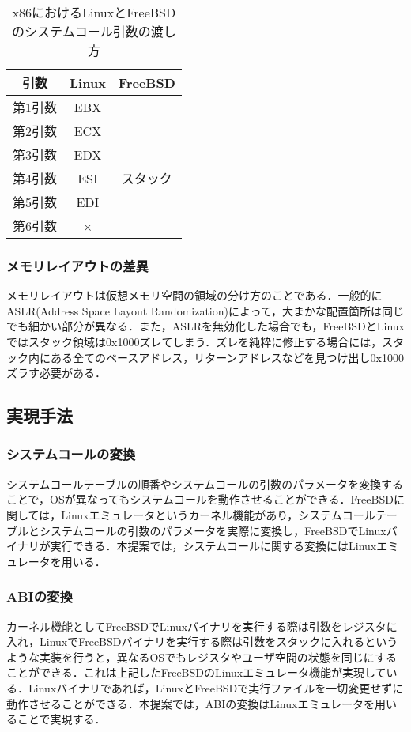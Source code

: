 \documentclass[11pt]{jarticle}
\begin{document}
\begin{table}
  \caption{x86におけるLinuxとFreeBSDのシステムコール引数の渡し方}
  \label{tb:argument}
  \begin{center}
  \begin{tabular}{|c|c|c|} \hline
    引数 & Linux & FreeBSD \\ \hline \hline
    第1引数 & EBX &  \\ \cline{1-2}
    第2引数 & ECX &  \\ \cline{1-2}
    第3引数 & EDX &  \\ \cline{1-2}
    第4引数 & ESI & スタック \\ \cline{1-2}
    第5引数 & EDI &  \\ \cline{1-2}
    第6引数 & × &  \\ \hline
  \end{tabular}
\end{center}
\end{table}

\subsubsection{メモリレイアウトの差異}
メモリレイアウトは仮想メモリ空間の領域の分け方のことである．一般的にASLR(Address Space Layout Randomization)によって，大まかな配置箇所は同じでも細かい部分が異なる．また，ASLRを無効化した場合でも，FreeBSDとLinuxではスタック領域は0x1000ズレてしまう．ズレを純粋に修正する場合には，スタック内にある全てのベースアドレス，リターンアドレスなどを見つけ出し0x1000ズラす必要がある．


\subsection{実現手法}
\subsubsection{システムコールの変換}
システムコールテーブルの順番やシステムコールの引数のパラメータを変換することで，OSが異なってもシステムコールを動作させることができる．FreeBSDに関しては，Linuxエミュレータ\cite{linux-emu}というカーネル機能があり，システムコールテーブルとシステムコールの引数のパラメータを実際に変換し，FreeBSDでLinuxバイナリが実行できる．本提案では，システムコールに関する変換にはLinuxエミュレータを用いる．

\subsubsection{ABIの変換}
カーネル機能としてFreeBSDでLinuxバイナリを実行する際は引数をレジスタに入れ，LinuxでFreeBSDバイナリを実行する際は引数をスタックに入れるというような実装を行うと，異なるOSでもレジスタやユーザ空間の状態を同じにすることができる．これは上記したFreeBSDのLinuxエミュレータ機能が実現している．Linuxバイナリであれば，LinuxとFreeBSDで実行ファイルを一切変更せずに動作させることができる．本提案では，ABIの変換はLinuxエミュレータを用いることで実現する．
\end{document}
